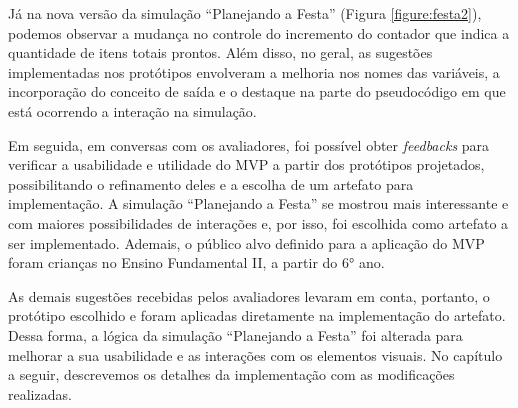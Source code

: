 Já na nova versão da simulação \enquote{Planejando a Festa} (Figura \ref{figure:festa2}), podemos observar a mudança no controle do incremento do contador que indica a quantidade de itens totais prontos. Além disso, no geral, as sugestões implementadas nos protótipos envolveram a melhoria nos nomes das variáveis, a incorporação do conceito de saída e o destaque na parte do pseudocódigo em que está ocorrendo a interação na simulação.

Em seguida, em conversas com os avaliadores, foi possível obter \textit{feedbacks} para verificar a usabilidade e utilidade do MVP a partir dos protótipos projetados, possibilitando o refinamento deles e a escolha de um artefato para implementação. A simulação \enquote{Planejando a Festa} se mostrou mais interessante e com maiores possibilidades de interações e, por isso, foi escolhida como artefato a ser implementado. Ademais, o público alvo definido para a aplicação do MVP foram crianças no Ensino Fundamental II, a partir do 6° ano.

As demais sugestões recebidas pelos avaliadores levaram em conta, portanto, o protótipo escolhido e foram aplicadas diretamente na implementação do artefato. Dessa forma, a lógica da simulação \enquote{Planejando a Festa} foi alterada para melhorar a sua usabilidade e as interações com os elementos visuais. No capítulo a seguir, descrevemos os detalhes da implementação com as modificações realizadas.
